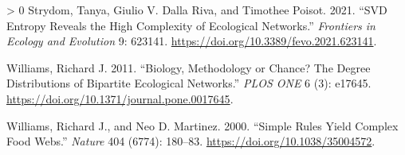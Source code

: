 \documentclass[11pt]{article}
\newlength{\cslhangindent}
\newenvironment{CSLReferences}[3] %
 {%
  \setlength{\parindent}{0pt}
  \ifodd #1 \everypar{\setlength{\hangindent}{\cslhangindent}}\ignorespaces\fi
  \ifnum #2 > 0
  \setlength{\parskip}{#2\baselineskip}
  \fi
 }%
 {}
\begin{document}
\begin{CSLReferences}{1}{0}
\leavevmode\hypertarget{ref-Strydom2021SvdEnt}{}%
Strydom, Tanya, Giulio V. Dalla Riva, and Timothee Poisot. 2021. {``SVD
Entropy Reveals the High Complexity of Ecological Networks.''}
\emph{Frontiers in Ecology and Evolution} 9: 623141.
\url{https://doi.org/10.3389/fevo.2021.623141}.

\leavevmode\hypertarget{ref-Williams2011BioMet}{}%
Williams, Richard J. 2011. {``Biology, Methodology or Chance? The Degree
Distributions of Bipartite Ecological Networks.''} \emph{PLOS ONE} 6
(3): e17645. \url{https://doi.org/10.1371/journal.pone.0017645}.

\leavevmode\hypertarget{ref-Williams2000SimRul}{}%
Williams, Richard J., and Neo D. Martinez. 2000. {``Simple Rules Yield
Complex Food Webs.''} \emph{Nature} 404 (6774): 180--83.
\url{https://doi.org/10.1038/35004572}.

\end{CSLReferences}
\end{document}
